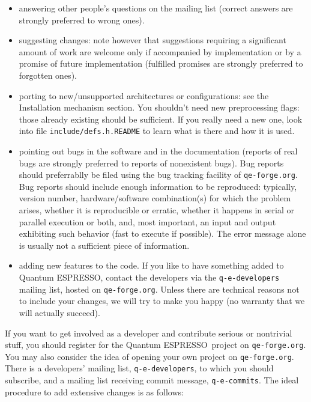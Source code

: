 \documentclass[12pt,a4paper]{article}
\def\qe{{\sc Quantum ESPRESSO}}
\begin{document}
\begin{itemize}
\item answering other people's questions on the mailing list (correct
  answers are strongly preferred to wrong ones). 
\item  suggesting changes: note however that suggestions requiring a
  significant amount of work are welcome only if accompanied by
  implementation or by a promise of future implementation (fulfilled
  promises are strongly preferred to forgotten ones). 
\item porting to new/unsupported architectures or configurations: see
  the Installation mechanism section. You shouldn't need new
  preprocessing flags: those already existing should be sufficient. If
  you really need a new one, look into file
  \texttt{include/defs.h.README} to learn what is there and how it is
  used. 
\item pointing out bugs in the software and in the documentation
  (reports of real bugs are strongly preferred to reports of
  nonexistent bugs). Bug reports should preferrablly be filed using
  the bug tracking facility of \texttt{qe-forge.org}. Bug reports
  should include enough information to be reproduced: typically, 
  version number, hardware/software combination(s) for which the
  problem arises, whether it is reproducible or erratic, whether
  it happens in serial or parallel
  execution or both, and, most important, an input and output
  exhibiting such behavior (fast to execute if possible). The error
  message alone is usually not a sufficient piece of information. 
\item adding new features to the code. If you like to have something
  added to \qe, contact the developers via the
 \texttt{q-e-developers} mailing list, hosted on \texttt{qe-forge.org}.
 Unless there are technical reasons not to include your changes, we 
 will try to make you happy (no warranty that we will actually succeed).
\end{itemize}
If you want to get involved as a developer and contribute serious
or nontrivial stuff, you should register for the \qe\ project on 
\texttt{qe-forge.org}. You may also consider the idea of opening
your own project on \texttt{qe-forge.org}. There is a developers' 
mailing list, \texttt{q-e-developers}, to which you should subscribe,
and a mailing list receiving commit message, \texttt{q-e-commits}.
The ideal procedure to add extensive changes is as follows:
\end{document}
